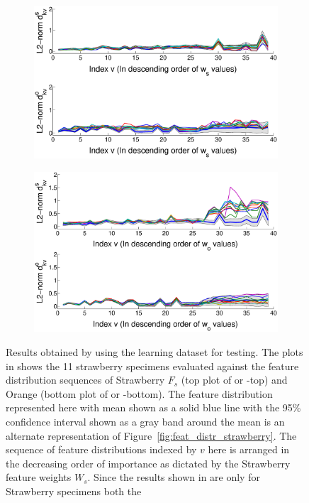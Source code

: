 \documentclass {udthesis}
\begin{document}
%
\begin{figure}
  \centering
  \vskip -10pt
  \begin{subfigure}[]{0.6\textwidth}
      \hskip -0.5cm
      \includegraphics[width=\textwidth, trim={0.5cm 0 3.8cm 0}, clip]{strawberry_learning_results}
      \caption{}
      \label{fig:feat_results_strawberry}
  \end{subfigure}
  \vskip -2pt
  \begin{subfigure}[]{0.6\textwidth}
      \hskip -0.5cm
      \includegraphics[width=\textwidth, trim={0.5cm 0 3.8cm 0}, clip]{orange_learning_results}
      \caption{}
      \label{fig:feat_results_orange}
  \end{subfigure}
\caption[Validation results showing the conformance of the specimens to the learnt feature distributions]{Results obtained by using the learning dataset for testing. The plots in  shows the 11 strawberry specimens evaluated against the feature distribution sequences of Strawberry $F_s$ (top plot of  or -top) and Orange (bottom plot of  or -bottom). The feature distribution represented here with mean shown as a solid blue line with the 95\% confidence interval shown as a gray band around the mean is an alternate representation of Figure~\ref{fig:feat_distr_strawberry}. The sequence of feature distributions indexed by $v$ here is arranged in the decreasing order of importance as dictated by the Strawberry feature weights $W_s$. Since the results shown in  are only for Strawberry specimens both the 
}
\end{figure}
\end{document}
